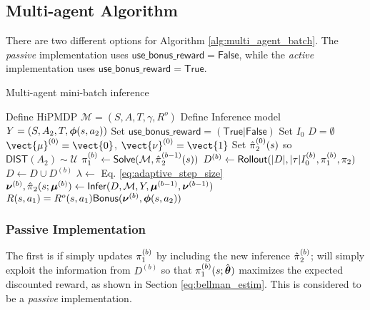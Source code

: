 \subsection{Multi-agent Algorithm}
	There are two different options for Algorithm \ref{alg:multi_agent_batch}. The \emph{passive} implementation uses $\mathsf{use\_bonus\_reward}=\mathsf{False}$, while the \emph{active} implementation uses $\mathsf{use\_bonus\_reward}=\mathsf{True}$.

	\begin{algorithm}
	\caption{Multi-agent mini-batch inference}
	\label{alg:multi_agent_batch}
	\begin{algorithmic}[1]
		\State Define \ac{HiPMDP} $\mathcal{M} = (S,A,T,\gamma,R^{o})$
		\State Define Inference model $Y=(S,A_2,T,\boldsymbol{\mathbb{\phi}}(s, a_2))$
		\State Set $\mathsf{use\_bonus\_reward}=(\mathsf{True}|\mathsf{False})$
		\State Set $I_0$
		\State $D=\emptyset$
		\State $\vect{\mu}^{(0)} = \vect{0}$, $\vect{\nu}^{(0)} = \vect{1}$ 
		\State Set $\hat{\pi_{}}_2^{(0)}(s)$ so $\mathsf{DIST}(A_2)\sim \mathcal{U}$ 
		\State $\pi_{1}^{(b)} \leftarrow \mathsf{Solve}(\mathcal{M},\hat{\pi_{}}_2^{(b-1)}(s) )$
		\State $D^{(b)} \leftarrow  \mathsf{Rollout}(|D|,|\tau|I_0^{(b)},\pi_{1}^{(b)}, \pi_{2})$
		\State $D \leftarrow D \cup D^{(b)}$
		\State $\lambda \leftarrow $ Eq. \ref{eq:adaptive_step_size}
		\State
		$\boldsymbol{\mathbb{\nu}}^{(b)} , \hat{\pi_{}}_2(s;\boldsymbol{\mathbb{\mu}}^{(b)})
		\leftarrow \mathsf{Infer}(D,\mathcal{M},Y,\boldsymbol{\mathbb{\mu}}^{(b-1)}, \boldsymbol{\mathbb{\nu}}^{(b-1)} )$
		\State $R(s,a_1) = R^{o}(s,a_1) \mathsf{Bonus}(\boldsymbol{\mathbb{\nu}}^{(b)}, \boldsymbol{\mathbb{\phi}}(s, a_2))$
		\EndIf
		\EndFor
	\end{algorithmic}
\end{algorithm}


	\subsubsection{Passive Implementation}
	 The first is if  simply updates $\pi_{1}^{(b)}$ by including the new inference  $\hat{\pi_{}}_2^{(b)}$;  will
    simply exploit the information from $D^{(b)}$ so that $\pi_{1}^{(b)}(s;\hat{\boldsymbol{\mathbb{\theta}}})$ maximizes the expected discounted reward,
    as shown in Section \ref{eq:bellman_estim}. This is considered to be a \textit{passive} implementation.

